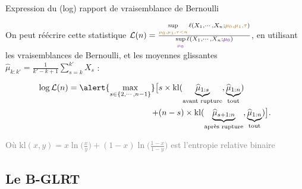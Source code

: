 \documentclass[11pt,french,ignorenonframetext,]{beamer}
\begin{document}
\begin{frame}{Expression du (log) rapport de vraisemblance de Bernoulli}

  On peut réécrire cette statistique
  $\mathcal{L}(n) = \frac{\sup\limits_{\textcolor{gold}{\mu_0,\mu_1,\tau < n}}\ell(X_1,\cdots,X_n ; \textcolor{gold}{\mu_0,\mu_1,\tau})}{\sup\limits_{\textcolor{deeppurple}{\mu_0}}\ell(X_1,\cdots,X_n ;\textcolor{deeppurple}{\mu_0})}$,
  en utilisant les vraisemblances de Bernoulli, et les moyennes glissantes $\widehat{\mu}_{k:k'} = \frac{1}{k'-k+1} \sum\limits_{s=k}^{k'} X_s$ :

  \begin{align*}
    \log \mathcal{L}(n) = \alert{\max_{s \in \{2,\cdots,n-1\}}} \bigl[
      & s \times \mathrm{kl} (\underbrace{\widehat{\mu}_{1:s}}_{\text{avant rupture}},\underbrace{\widehat{\mu}_{1:n}}_{\text{tout}} ) \\
      + & (n-s) \times \mathrm{kl} (\underbrace{\widehat{\mu}_{s+1:n}}_{\text{après rupture}},\underbrace{\widehat{\mu}_{1:n}}_{\text{tout}} ) \bigr].
  \end{align*}

  \begin{small}
    \textcolor{gray}{Où $\mathrm{kl}(x,y) =x \ln\bigl(\frac{x}{y}\bigr) + (1-x)\ln\bigl(\frac{1-x}{1-y}\bigr)$ est l'entropie relative binaire}
  \end{small}

\end{frame}


\subsection{\hfill{}Le B-GLRT\hfill{}}
\end{document}
